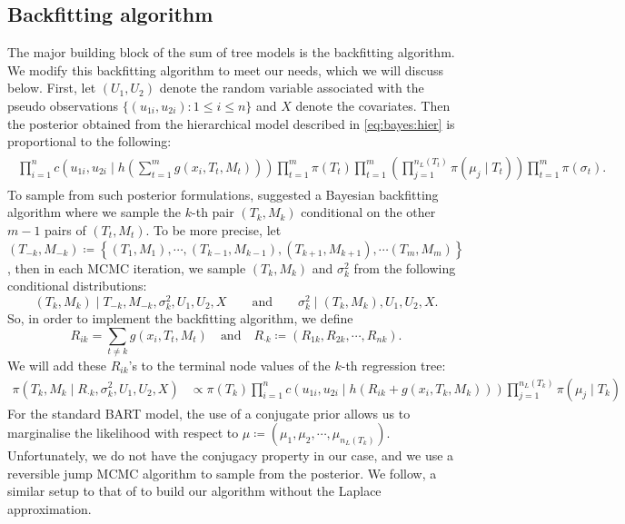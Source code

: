 \documentclass[
12pt]{article}
\begin{document}
	\subsection{Backfitting algorithm}
	
	The major building block of the sum of tree models is the backfitting algorithm. We modify this backfitting algorithm to meet our needs, which we will discuss below. First, let $(U_1,U_2)$ denote the random variable associated with the pseudo observations $\{(u_{1i},u_{2i}):1\le i \le n\}$ and $X$ denote the covariates. Then the posterior obtained from the hierarchical model described in \cref{eq:bayes:hier} is proportional to the following:
	\begin{align*}
		\begin{split}
			\prod_{i=1}^{n}c\left(u_{1i},u_{2i}\mid h\left(\sum_{t=1}^m g(x_i, T_t, M_t)\right)\right)\prod_{t=1}^{m}\pi(T_t)\prod_{t=1}^{m}\left(\prod_{j=1}^{n_L(T_t)}\pi(\mu_j\mid T_t)\right)\prod_{t=1}^{m}\pi(\sigma_{t}).
		\end{split}
	\end{align*}
	To sample from such posterior formulations, \citet{chipman2010BART} suggested a Bayesian backfitting algorithm where we sample the $k$-th pair $(T_k,M_k)$ conditional on the other $m-1$ pairs of $(T_t,M_t)$. To be more precise, let $(T_{-k},M_{-k})\coloneq \left\{(T_1,M_1),\cdots,(T_{k-1},M_{k-1}),(T_{k+1},M_{k+1}),\cdots(T_m,M_m)\right\}$,
	then in each MCMC iteration, we sample $(T_k, M_k)$  and $\sigma^2_k$ from the following conditional distributions: 
	\begin{equation*}
		(T_k,M_k)\mid T_{-k},M_{-k}, \sigma^2_{k}, U_1, U_2, X \qquad \text{and}\qquad \sigma^2_{k} \mid (T_k,M_k),U_1,U_2,X.
	\end{equation*}
	So, in order to implement the backfitting algorithm, we define 
	\begin{equation*}
		R_{ik} = \sum_{t\not=k}g(x_i, T_t, M_t)\quad\text{and}\quad R_{\cdot k}\coloneqq(R_{1k},R_{2k},\cdots,R_{nk}).
	\end{equation*}
	We will add these $R_{ik}$'s to the terminal node values of the $k$-th regression tree:
	\begin{align*}
		\pi(T_k,M_k \mid R_{\cdot k}, \sigma^2_{k}, U_1,U_2, X) &\propto \pi(T_k)\prod_{i=1}^{n}c\left(u_{1i},u_{2i}\mid h\left(R_{ik}+g(x_i, T_k, M_k)\right)\right)\prod_{j=1}^{n_L(T_k)}\pi(\mu_j\mid T_k)
	\end{align*}
	For the standard BART model, the use of a conjugate prior allows us to marginalise the likelihood with respect to $\mu\coloneqq\left(\mu_1,\mu_2,\cdots,\mu_{n_L(T_k)}\right)$. Unfortunately, we do not have the conjugacy property in our case, and we use a reversible jump MCMC algorithm \citep{green_RJMCMC} to sample from the posterior. We follow, a similar setup to that of \citet{Linero02012025} to build our algorithm without the Laplace approximation.
	
\end{document}
